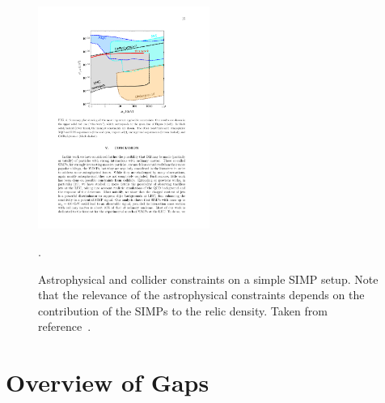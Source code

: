 \begin{figure}[htb]
\centering
\includegraphics[width=0.5\textwidth]{plots/simps_constraints.pdf}
\caption{Astrophysical and collider constraints on a simple SIMP setup. Note that the relevance of the astrophysical constraints depends on the contribution of the SIMPs to the relic density. Taken from reference~\cite{Daci:2015hca}.}
  \label{fig:simps}.
\end{figure}


\section{Overview of Gaps}
\label{sec:covgaps}


